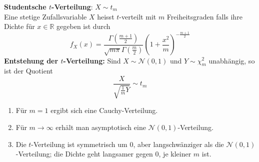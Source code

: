 \textbf{Studentsche $t$-Verteilung}: $X \sim t_{m}$\\
Eine stetige Zufallsvariable $X$ heisst $t$-verteilt mit $m$ Freiheitsgraden falls ihre Dichte für $x \in \mathbb{R}$ gegeben ist durch
$$
f_{X}(x)=\frac{\Gamma\left(\frac{m+1}{2}\right)}{\sqrt{m \pi} \Gamma\left(\frac{m}{2}\right)}\left(1+\frac{x^{2}}{m}\right)^{-\frac{m+1}{2}}
$$
\textbf{Entstehung der $t$-Verteilung:} Sind $X \sim \mathcal{N}(0,1)$ und $Y \sim \chi_{m}^{2}$ unabhängig, so ist der Quotient
$$
\frac{X}{\sqrt{\frac{1}{m} Y}} \sim t_{m}
$$
\begin{enumerate}
	\item Für $m=1$ ergibt sich eine Cauchy-Verteilung.
	\item Für $m \rightarrow \infty$ erhält man asymptotisch eine $\mathcal{N}(0,1)$-Verteilung.
	\item Die $t$-Verteilung ist symmetrisch um 0, aber langschwänziger als die $\mathcal{N}(0,1)$-Verteilung; die Dichte geht langsamer gegen 0, je kleiner $m$ ist.
\end{enumerate}

